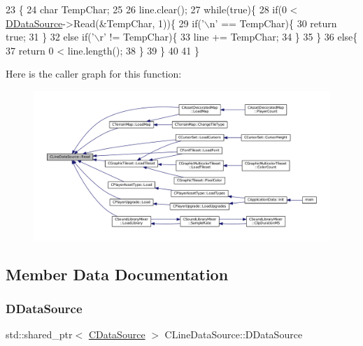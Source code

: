 \begin{DoxyCode}
23                                          \{
24     \textcolor{keywordtype}{char} TempChar;
25     
26     line.clear();
27     \textcolor{keywordflow}{while}(\textcolor{keyword}{true})\{
28         \textcolor{keywordflow}{if}(0 < \hyperlink{classCLineDataSource_a976b7e02379cb8b29eb16cfedd1352cb}{DDataSource}->Read(&TempChar, 1))\{
29             \textcolor{keywordflow}{if}(\textcolor{charliteral}{'\(\backslash\)n'} == TempChar)\{
30                 \textcolor{keywordflow}{return} \textcolor{keyword}{true};
31             \}
32             \textcolor{keywordflow}{else} \textcolor{keywordflow}{if}(\textcolor{charliteral}{'\(\backslash\)r'} != TempChar)\{
33                 line += TempChar;
34             \}
35         \}
36         \textcolor{keywordflow}{else}\{
37             \textcolor{keywordflow}{return} 0 < line.length();
38         \}
39     \}
40     
41 \}
\end{DoxyCode}
Here is the caller graph for this function\+:
\nopagebreak
\begin{figure}[H]
\begin{center}
\leavevmode
\includegraphics[width=350pt]{classCLineDataSource_a569f5a9732d73ac8813c0ba4860e2e66_icgraph}
\end{center}
\end{figure}


\subsection{Member Data Documentation}
\hypertarget{classCLineDataSource_a976b7e02379cb8b29eb16cfedd1352cb}{}\label{classCLineDataSource_a976b7e02379cb8b29eb16cfedd1352cb} 
\subsubsection{\texorpdfstring{D\+Data\+Source}{DDataSource}}
{\footnotesize\ttfamily std\+::shared\+\_\+ptr$<$ \hyperlink{classCDataSource}{C\+Data\+Source} $>$ C\+Line\+Data\+Source\+::\+D\+Data\+Source\hspace{0.3cm}{\ttfamily [protected]}}



